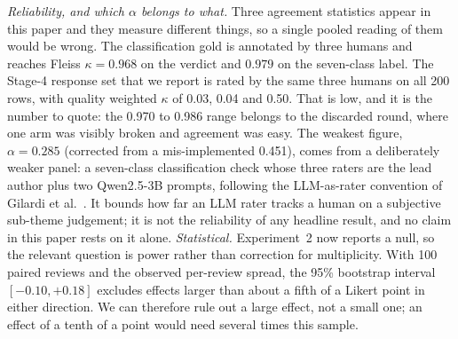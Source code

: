 \documentclass[sigconf, anonymous]{acmart}
\begin{document}
\emph{Reliability, and which $\alpha$ belongs to what.} Three agreement statistics appear in this paper and they measure different things, so a single pooled reading of them would be wrong. The classification gold is annotated by three humans and reaches Fleiss $\kappa = 0.968$ on the verdict and $0.979$ on the seven-class label. The Stage-4 response set that we report is rated by the same three humans on all 200 rows, with quality weighted $\kappa$ of 0.03, 0.04 and 0.50. That is low, and it is the number to quote: the 0.970 to 0.986 range belongs to the discarded round, where one arm was visibly broken and agreement was easy. The weakest figure, $\alpha = 0.285$ (corrected from a mis-implemented 0.451), comes from a deliberately weaker panel: a seven-class classification check whose three raters are the lead author plus two Qwen2.5-3B prompts, following the LLM-as-rater convention of Gilardi et al.~\cite{gilardi2023chatgpt}. It bounds how far an LLM rater tracks a human on a subjective sub-theme judgement; it is not the reliability of any headline result, and no claim in this paper rests on it alone.
\emph{Statistical.} Experiment~2 now reports a null, so the relevant question is power rather than correction for multiplicity. With 100 paired reviews and the observed per-review spread, the 95\% bootstrap interval $[-0.10, +0.18]$ excludes effects larger than about a fifth of a Likert point in either direction. We can therefore rule out a large effect, not a small one; an effect of a tenth of a point would need several times this sample.
\end{document}
